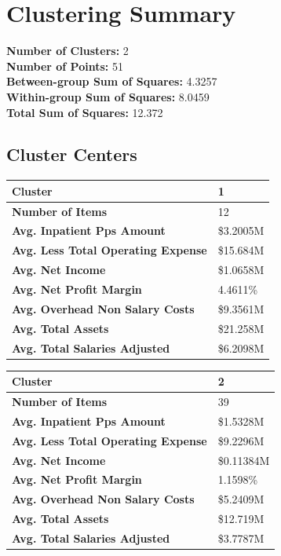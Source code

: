 \documentclass{article}
\theoremstyle{mytheoremstyle}
\theoremstyle{mytheoremstyle}
\theoremstyle{myproblemstyle}
\begin{document}
\section*{Clustering Summary}
\noindent\textbf{Number of Clusters:} 2 \\
\textbf{Number of Points:} 51 \\
\textbf{Between-group Sum of Squares:} 4.3257 \\
\textbf{Within-group Sum of Squares:} 8.0459 \\
\textbf{Total Sum of Squares:} 12.372

\subsection*{Cluster Centers}

\begin{tabular}{@{}ll@{}}
\toprule
\textbf{Cluster} & \textbf{1} \\
\midrule
\textbf{Number of Items} & 12 \\
\textbf{Avg. Inpatient Pps Amount} & \$3.2005M \\
\textbf{Avg. Less Total Operating Expense} & \$15.684M \\
\textbf{Avg. Net Income} & \$1.0658M \\
\textbf{Avg. Net Profit Margin} & 4.4611\% \\
\textbf{Avg. Overhead Non Salary Costs} & \$9.3561M \\
\textbf{Avg. Total Assets} & \$21.258M \\
\textbf{Avg. Total Salaries Adjusted} & \$6.2098M \\
\bottomrule
\end{tabular}

\vspace{10mm} %

\begin{tabular}{@{}ll@{}}
\toprule
\textbf{Cluster} & \textbf{2} \\
\midrule
\textbf{Number of Items} & 39 \\
\textbf{Avg. Inpatient Pps Amount} & \$1.5328M \\
\textbf{Avg. Less Total Operating Expense} & \$9.2296M \\
\textbf{Avg. Net Income} & \$0.11384M \\
\textbf{Avg. Net Profit Margin} & 1.1598\% \\
\textbf{Avg. Overhead Non Salary Costs} & \$5.2409M \\
\textbf{Avg. Total Assets} & \$12.719M \\
\textbf{Avg. Total Salaries Adjusted} & \$3.7787M \\
\bottomrule
\end{tabular}
\end{document}
